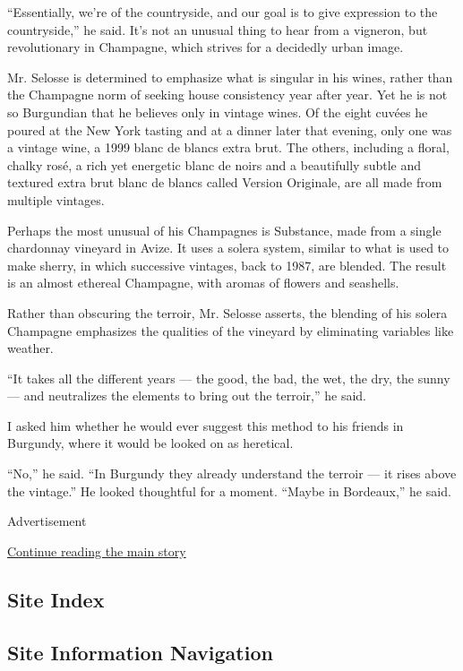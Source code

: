 ``Essentially, we're of the countryside, and our goal is to give
expression to the countryside,'' he said. It's not an unusual thing to
hear from a vigneron, but revolutionary in Champagne, which strives for
a decidedly urban image.

Mr. Selosse is determined to emphasize what is singular in his wines,
rather than the Champagne norm of seeking house consistency year after
year. Yet he is not so Burgundian that he believes only in vintage
wines. Of the eight cuvées he poured at the New York tasting and at a
dinner later that evening, only one was a vintage wine, a 1999 blanc de
blancs extra brut. The others, including a floral, chalky rosé, a rich
yet energetic blanc de noirs and a beautifully subtle and textured extra
brut blanc de blancs called Version Originale, are all made from
multiple vintages.

Perhaps the most unusual of his Champagnes is Substance, made from a
single chardonnay vineyard in Avize. It uses a solera system, similar to
what is used to make sherry, in which successive vintages, back to 1987,
are blended. The result is an almost ethereal Champagne, with aromas of
flowers and seashells.

Rather than obscuring the terroir, Mr. Selosse asserts, the blending of
his solera Champagne emphasizes the qualities of the vineyard by
eliminating variables like weather.

``It takes all the different years --- the good, the bad, the wet, the
dry, the sunny --- and neutralizes the elements to bring out the
terroir,'' he said.

I asked him whether he would ever suggest this method to his friends in
Burgundy, where it would be looked on as heretical.

``No,'' he said. ``In Burgundy they already understand the terroir ---
it rises above the vintage.'' He looked thoughtful for a moment. ``Maybe
in Bordeaux,'' he said.

Advertisement

\protect\hyperlink{after-bottom}{Continue reading the main story}

\hypertarget{site-index}{%
\subsection{Site Index}\label{site-index}}

\hypertarget{site-information-navigation}{%
\subsection{Site Information
Navigation}\label{site-information-navigation}}

